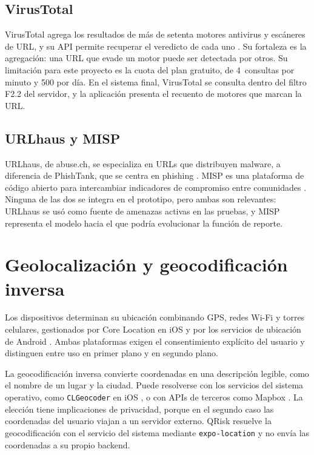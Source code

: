 \subsection{VirusTotal}

VirusTotal agrega los resultados de más de setenta motores antivirus y escáneres de URL, y su API permite recuperar el veredicto de cada uno \cite{virustotal_apiv3}. Su fortaleza es la agregación: una URL que evade un motor puede ser detectada por otros. Su limitación para este proyecto es la cuota del plan gratuito, de 4~consultas por minuto y 500 por día. En el sistema final, VirusTotal se consulta dentro del filtro F2.2 del servidor, y la aplicación presenta el recuento de motores que marcan la URL.

\subsection{URLhaus y MISP}

URLhaus, de abuse.ch, se especializa en URLs que distribuyen malware, a diferencia de PhishTank, que se centra en phishing \cite{urlhaus_api}. MISP es una plataforma de código abierto para intercambiar indicadores de compromiso entre comunidades \cite{misp_project}. Ninguna de las dos se integra en el prototipo, pero ambas son relevantes: URLhaus se usó como fuente de amenazas activas en las pruebas, y MISP representa el modelo hacia el que podría evolucionar la función de reporte.

\section{Geolocalización y geocodificación inversa}

Los dispositivos determinan su ubicación combinando GPS, redes Wi-Fi y torres celulares, gestionados por Core Location en iOS y por los servicios de ubicación de Android \cite{apple_location_auth,android_location_permissions}. Ambas plataformas exigen el consentimiento explícito del usuario y distinguen entre uso en primer plano y en segundo plano.

La geocodificación inversa convierte coordenadas en una descripción legible, como el nombre de un lugar y la ciudad. Puede resolverse con los servicios del sistema operativo, como \texttt{CLGeocoder} en iOS \cite{apple_clgeocoder}, o con APIs de terceros como Mapbox \cite{mapbox_geocoding}. La elección tiene implicaciones de privacidad, porque en el segundo caso las coordenadas del usuario viajan a un servidor externo. QRisk resuelve la geocodificación con el servicio del sistema mediante \texttt{expo-location} y no envía las coordenadas a su propio backend.

